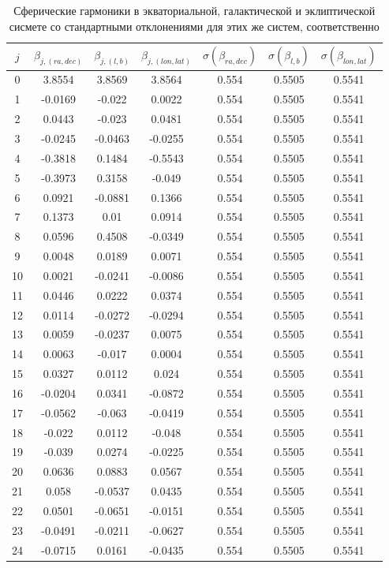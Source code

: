 \documentclass[14pt]{article} %
\begin{document}
\newpage
\begin{spacing}{1.0}

\begin{table}[h!]
\centering
\caption{Сферические гармоники в экваториальной, галактической и эклиптической сисмете со стандартными отклонениями для этих же систем, соответственно}
\label{tabular:sf_all}
\begin{tabular}{|c|c|c|c|c|c|c|}
\hline 	
$j$ &$\beta_{j,(ra,dec)}$ &$\beta_{j,(l,b)}$ &$\beta_{j,(lon,lat)}$ &$\sigma(\beta_{ra,dec})$ &$\sigma(\beta_{l,b})$ & $\sigma(\beta_{lon,lat})$\\
\hline 	
\rowcolor{Gray}
0 &3.8554 &3.8569 &3.8564 &0.554 &0.5505 &0.5541\\
1 &-0.0169 &-0.022 &0.0022 &0.554 &0.5505 &0.5541\\
2 &0.0443 &-0.023 &0.0481 &0.554 &0.5505 &0.5541\\
3 &-0.0245 &-0.0463 &-0.0255 &0.554 &0.5505 &0.5541\\
\rowcolor{Gray}
4 &-0.3818 &0.1484 &-0.5543 &0.554 &0.5505 &0.5541\\
5 &-0.3973 &0.3158 &-0.049 &0.554 &0.5505 &0.5541\\
6 &0.0921 &-0.0881 &0.1366 &0.554 &0.5505 &0.5541\\
7 &0.1373 &0.01 &0.0914 &0.554 &0.5505 &0.5541\\
8 &0.0596 &0.4508 &-0.0349 &0.554 &0.5505 &0.5541\\
9 &0.0048 &0.0189 &0.0071 &0.554 &0.5505 &0.5541\\
10 &0.0021 &-0.0241 &-0.0086 &0.554 &0.5505 &0.5541\\
11 &0.0446 &0.0222 &0.0374 &0.554 &0.5505 &0.5541\\
12 &0.0114 &-0.0272 &-0.0294 &0.554 &0.5505 &0.5541\\
13 &0.0059 &-0.0237 &0.0075 &0.554 &0.5505 &0.5541\\
14 &0.0063 &-0.017 &0.0004 &0.554 &0.5505 &0.5541\\
15 &0.0327 &0.0112 &0.024 &0.554 &0.5505 &0.5541\\
16 &-0.0204 &0.0341 &-0.0872 &0.554 &0.5505 &0.5541\\
17 &-0.0562 &-0.063 &-0.0419 &0.554 &0.5505 &0.5541\\
18 &-0.022 &0.0112 &-0.048 &0.554 &0.5505 &0.5541\\
19 &-0.039 &0.0274 &-0.0225 &0.554 &0.5505 &0.5541\\
20 &0.0636 &0.0883 &0.0567 &0.554 &0.5505 &0.5541\\
21 &0.058 &-0.0537 &0.0435 &0.554 &0.5505 &0.5541\\
22 &0.0501 &-0.0651 &-0.0151 &0.554 &0.5505 &0.5541\\
23 &-0.0491 &-0.0211 &-0.0627 &0.554 &0.5505 &0.5541\\
24 &-0.0715 &0.0161 &-0.0435 &0.554 &0.5505 &0.5541\\
\hline 
\end{tabular}
\end{table}


\end{spacing}
\end{document}
